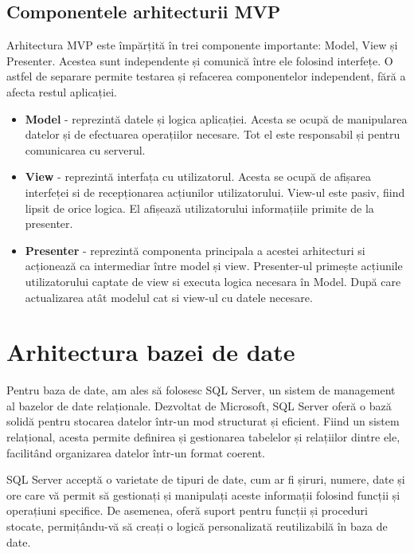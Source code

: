 \subsection{Componentele arhitecturii MVP}

Arhitectura MVP este împărțită în trei componente importante: Model, View și Presenter. Acestea sunt independente și comunică între ele folosind interfețe. O astfel de separare permite testarea și refacerea componentelor independent, fără a afecta restul aplicației.

\begin{itemize}
    \item \textbf{Model} - reprezintă datele și logica aplicației. Acesta se ocupă de manipularea datelor și de efectuarea operațiilor necesare. Tot el este responsabil și pentru comunicarea cu serverul.
    \item \textbf{View} - reprezintă interfața cu utilizatorul. Acesta se ocupă de afișarea interfeței si de recepționarea acțiunilor utilizatorului. View-ul este pasiv, fiind lipsit de orice logica. El afișează utilizatorului informațiile primite de la presenter.
    \item \textbf{Presenter} - reprezintă componenta principala a acestei arhitecturi si acționează ca intermediar între model și view. Presenter-ul primește acțiunile utilizatorului captate de view si executa logica necesara în Model. După care actualizarea atât modelul cat si view-ul cu datele necesare.
\end{itemize}

\section{Arhitectura bazei de date}

Pentru baza de date, am ales să folosesc SQL Server, un sistem de management al bazelor de date relaționale. Dezvoltat de Microsoft, SQL Server oferă o bază solidă pentru stocarea datelor într-un mod structurat și eficient. Fiind un sistem relațional, acesta permite definirea și gestionarea tabelelor și relațiilor dintre ele, facilitând organizarea datelor într-un format coerent.

SQL Server acceptă o varietate de tipuri de date, cum ar fi șiruri, numere, date și ore care vă permit să gestionați și manipulați aceste informații folosind funcții și operațiuni specifice. De asemenea, oferă suport pentru funcții și proceduri stocate, permițându-vă să creați o logică personalizată reutilizabilă în baza de date.

